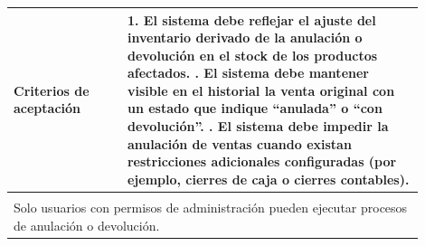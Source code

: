 \begin{longtable}{|p{0.25\linewidth}|p{0.15\linewidth}|p{0.15\linewidth}|p{0.35\linewidth}|}
		\cellcolor{tableheaderblue}\textbf{Criterios de aceptación} & \multicolumn{3}{p{0.70\linewidth}|}{                                                                                            %
			1. El sistema debe reflejar el ajuste del inventario derivado de la anulación o devolución en el stock de los productos afectados. \newline
			2. El sistema debe mantener visible en el historial la venta original con un estado que indique “anulada” o “con devolución”. \newline
		3. El sistema debe impedir la anulación de ventas cuando existan restricciones adicionales configuradas (por ejemplo, cierres de caja o cierres contables).}                                  \\ \hline
		\rowcolor{tableheaderblue}
		\multicolumn{4}{|l|}{\textbf{Restricciones}}                                                                                                                                                  \\ \hline
		\multicolumn{4}{|p{0.96\linewidth}|}{%
		Solo usuarios con permisos de administración pueden ejecutar procesos de anulación o devolución.}                                                                                             \\ \hline
	
\end{longtable}
\endgroup


